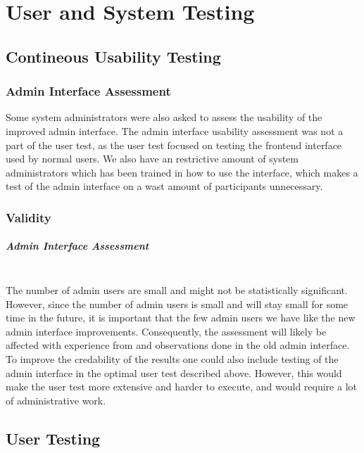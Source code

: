 \chapter{User and System Testing}

\section{Contineous Usability Testing}

\subsection{Admin Interface Assessment}
Some system administrators were also asked to assess the usability of the improved admin interface. The admin interface usability assessment was not a part of the user test, as the user test focused on testing the frontend interface used by normal users. We also have an restrictive amount of system administrators which has been trained in how to use the interface, which makes a test of the admin interface on a wast amount of participants unnecessary.


\subsection{Validity}
\paragraph*{Admin Interface Assessment} \hfill \\
The number of admin users are small and might not be statistically significant. However, since the number of admin users is small and will stay small for some time in the future, it is important that the few admin users we have like the new admin interface improvements. Consequently, the assessment will likely be affected with experience from and observations done in the old admin interface. To improve the credability of the results one could also include testing of the admin interface in the optimal user test described above. However, this would make the user test more extensive and harder to execute, and would require a lot of administrative work.

\section{User Testing}

